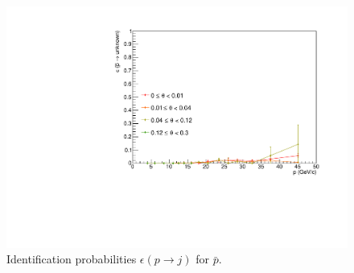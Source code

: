 \begin{figure}[!p]
  \includegraphics[scale=0.38]{./gfx/pm_u.pdf}
	\caption{Identification probabilities $\epsilon(p \rightarrow j)$ for $\bar{p}$.}
	\label{pic:Effpm}
\end{figure}
